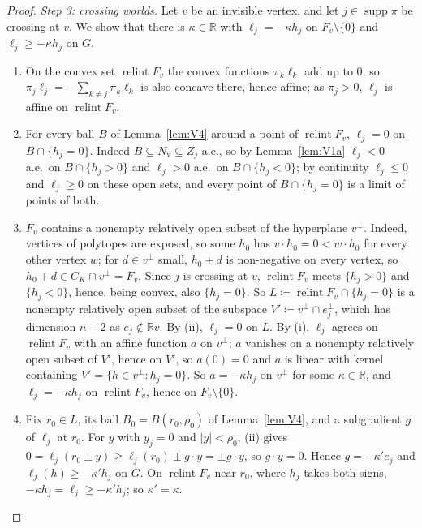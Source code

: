 \documentclass[11pt]{article}
\newcommand{\R}{\mathbb{R}}
\DeclareMathOperator{\relint}{relint}
\DeclareMathOperator{\supp}{supp}
\theoremstyle{plain}
\theoremstyle{definition}
\theoremstyle{remark}
\begin{document}
\begin{proof}
\emph{Step 3: crossing worlds.} Let $v$ be an invisible vertex, and let $j\in\supp\pi$ be
crossing at $v$. We show that there is $\kappa\in\R$ with $\ell_j=-\kappa h_j$ on
$F_v\setminus\{0\}$ and $\ell_j\ge-\kappa h_j$ on $G$.
\begin{enumerate}[label=(\roman*)]
  \item On the convex set $\relint F_v$ the convex functions $\pi_k\ell_k$ add up to $0$,
  so $\pi_j\ell_j=-\sum_{k\ne j}\pi_k\ell_k$ is also concave there, hence affine; as
  $\pi_j>0$, $\ell_j$ is affine on $\relint F_v$.
  \item For every ball $B$ of Lemma~\ref{lem:V4} around a point of $\relint F_v$,
  $\ell_j=0$ on $B\cap\{h_j=0\}$. Indeed $B\subseteq N_{\mathrm v}\subseteq Z_j$ a.e., so
  by Lemma~\ref{lem:V1a} $\ell_j<0$ a.e.\ on $B\cap\{h_j>0\}$ and $\ell_j>0$ a.e.\ on
  $B\cap\{h_j<0\}$; by continuity $\ell_j\le0$ and $\ell_j\ge0$ on these open sets, and
  every point of $B\cap\{h_j=0\}$ is a limit of points of both.
  \item $F_v$ contains a nonempty relatively open subset of the hyperplane $v^\perp$.
  Indeed,
  vertices of polytopes are exposed, so some $h_0$ has $v\cdot h_0=0<w\cdot h_0$ for every
  other vertex $w$; for $d\in v^\perp$ small, $h_0+d$ is non-negative on every vertex, so
  $h_0+d\in C_K\cap v^\perp=F_v$. Since $j$ is crossing at $v$, $\relint F_v$ meets
  $\{h_j>0\}$ and $\{h_j<0\}$, hence, being convex, also $\{h_j=0\}$. So $L\coloneqq
  \relint F_v\cap\{h_j=0\}$ is a nonempty relatively open subset of the subspace
  $V'\coloneqq v^\perp\cap e_j^\perp$, which has dimension $n-2$ as $e_j\notin\R v$. By
  (ii), $\ell_j=0$ on $L$. By (i), $\ell_j$ agrees on $\relint F_v$ with an affine function
  $a$ on $v^\perp$; $a$ vanishes on a nonempty relatively open subset of $V'$, hence on
  $V'$, so $a(0)=0$ and $a$ is linear with
  kernel containing $V'=\{h\in v^\perp:h_j=0\}$. So $a=-\kappa h_j$ on $v^\perp$ for some
  $\kappa\in\R$, and $\ell_j=-\kappa h_j$ on $\relint F_v$, hence on $F_v\setminus\{0\}$.
  \item Fix $r_0\in L$, its ball $B_0=B(r_0,\rho_0)$ of Lemma~\ref{lem:V4}, and a
  subgradient $g$ of $\ell_j$ at $r_0$. For $y$ with $y_j=0$ and $|y|<\rho_0$, (ii) gives
  $0=\ell_j(r_0\pm y)\ge\ell_j(r_0)\pm g\cdot y=\pm g\cdot y$, so $g\cdot y=0$. Hence
  $g=-\kappa'e_j$ and $\ell_j(h)\ge-\kappa'h_j$ on $G$. On $\relint F_v$ near $r_0$, where
  $h_j$ takes both signs, $-\kappa h_j=\ell_j\ge-\kappa'h_j$; so $\kappa'=\kappa$.
\end{enumerate}


\end{proof}
\end{document}

